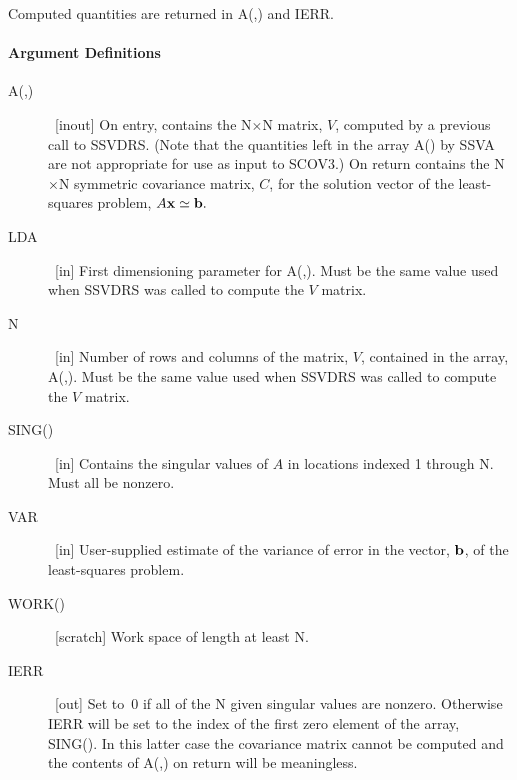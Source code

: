 \documentclass[twoside]{MATH77}
\begin{document}
\begin{center}
\end{center}

Computed quantities are returned in A(,) and IERR.

\paragraph{Argument Definitions}

\begin{description}
\item[A(,)]  \ [inout] On entry, contains the N$\times $N matrix, $V$,
computed by a previous call to SSVDRS. (Note that the quantities left in the
array A() by SSVA are not appropriate for use as input to SCOV3.) On return
contains the N$\times $N symmetric covariance matrix, $C$, for the solution
vector of the least-squares problem, $A{\bf x}\simeq {\bf b}.$

\item[LDA]  \ [in] First dimensioning parameter for A(,). Must be the
same value used when SSVDRS was called to compute the $V$ matrix.

\item[N]  \ [in] Number of rows and columns of the matrix, $V$, contained in
the array, A(,). Must be the same value used when SSVDRS was called
to compute the $V$ matrix.

\item[SING()]  \ [in] Contains the singular values of $A$ in locations indexed
1 through N. Must all be nonzero.

\item[VAR]  \ [in] User-supplied estimate of the variance of error in the
vector, ${\bf b}$, of the least-squares problem.

\item[WORK()]  \ [scratch] Work space of length at least N.

\item[IERR]  \ [out] Set to~0 if all of the N given singular values are
nonzero. Otherwise IERR will be set to the index of the first zero element
of the array, SING(). In this latter case the covariance matrix cannot be
computed and the contents of A(,) on return will be meaningless.
\end{description}
\end{document}
